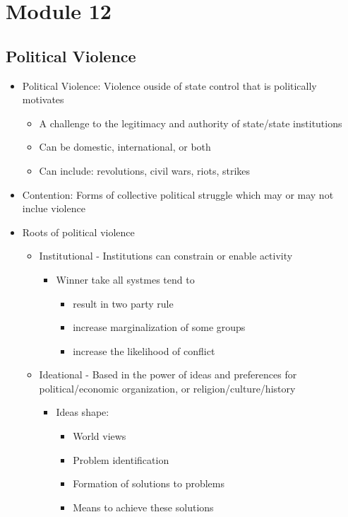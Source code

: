 \documentclass[11pt]{article}
\author{Sudhan Chitgopkar}
\date{\today}
\title{}
\begin{document}
\tableofcontents

\section{Module 12}
\label{sec:org1632f55}
\subsection{Political Violence}
\label{sec:org3effd5b}
\begin{itemize}
\item Political Violence: Violence ouside of state control that is politically motivates
\begin{itemize}
\item A challenge to the legitimacy and authority of state/state institutions
\item Can be domestic, international, or both
\item Can include: revolutions, civil wars, riots, strikes
\end{itemize}
\item Contention: Forms of collective political struggle which may or may not inclue violence
\item Roots of political violence
\begin{itemize}
\item Institutional - Institutions can constrain or enable activity
\begin{itemize}
\item Winner take all systmes tend to
\begin{itemize}
\item result in two party rule
\item increase marginalization of some groups
\item increase the likelihood of conflict
\end{itemize}
\end{itemize}
\item Ideational - Based in the power of ideas and preferences for political/economic organization, or religion/culture/history
\begin{itemize}
\item Ideas shape:
\begin{itemize}
\item World views
\item Problem identification
\item Formation of solutions to problems
\item Means to achieve these solutions

\end{itemize}
\end{itemize}
\end{itemize}
\end{itemize}
\end{document}
